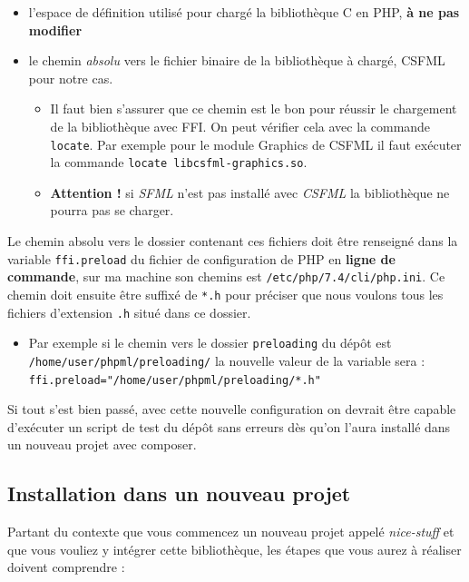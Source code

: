 \documentclass[11pt,a4paper,krantz2,11pt,oneside]{krantz}
\providecommand{\tightlist}{%
  \setlength{\itemsep}{0pt}\setlength{\parskip}{0pt}}
\begin{document}
\begin{itemize}
\tightlist
\item
  l'espace de définition utilisé pour chargé la bibliothèque C en PHP, \textbf{à ne pas modifier}
\item
  le chemin \emph{absolu} vers le fichier binaire de la bibliothèque à chargé, CSFML pour notre cas.

  \begin{itemize}
  \tightlist
  \item
    Il faut bien s'assurer que ce chemin est le bon pour réussir le chargement de la bibliothèque avec FFI. On peut vérifier cela avec la commande \texttt{locate}. Par exemple pour le module Graphics de CSFML il faut exécuter la commande \texttt{locate\ libcsfml-graphics.so}.
  \item
    \textbf{Attention !} si \emph{SFML} n'est pas installé avec \emph{CSFML} la bibliothèque ne pourra pas se charger.
  \end{itemize}
\end{itemize}

Le chemin absolu vers le dossier contenant ces fichiers doit être renseigné dans la variable \texttt{ffi.preload} du fichier de configuration de PHP en \textbf{ligne de commande}, sur ma machine son chemins est \texttt{/etc/php/7.4/cli/php.ini}. Ce chemin doit ensuite être suffixé de \texttt{*.h} pour préciser que nous voulons tous les fichiers d'extension \texttt{.h} situé dans ce dossier.

\begin{itemize}
\tightlist
\item
  Par exemple si le chemin vers le dossier \texttt{preloading} du dépôt est \texttt{/home/user/phpml/preloading/} la nouvelle valeur de la variable sera : \texttt{ffi.preload="/home/user/phpml/preloading/*.h"}
\end{itemize}

Si tout s'est bien passé, avec cette nouvelle configuration on devrait être capable d'exécuter un script de test du dépôt sans erreurs dès qu'on l'aura installé dans un nouveau projet avec composer.

\hypertarget{installation-dans-un-nouveau-projet}{%
\subsection{Installation dans un nouveau projet}\label{installation-dans-un-nouveau-projet}}

Partant du contexte que vous commencez un nouveau projet appelé \emph{nice-stuff} et que vous vouliez y intégrer cette bibliothèque, les étapes que vous aurez à réaliser doivent comprendre :
\end{document}

